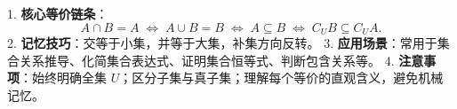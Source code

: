 \begin{summarybox}
1. \textbf{核心等价链条}：
   \[
   A\cap B = A \;\Leftrightarrow\; A\cup B = B \;\Leftrightarrow\; A\subseteq B \;\Leftrightarrow\; C_U B \subseteq C_U A.
   \]
2. \textbf{记忆技巧}：交等于小集，并等于大集，补集方向反转。
3. \textbf{应用场景}：常用于集合关系推导、化简集合表达式、证明集合恒等式、判断包含关系等。
4. \textbf{注意事项}：始终明确全集 $U$；区分子集与真子集；理解每个等价的直观含义，避免机械记忆。
\end{summarybox}